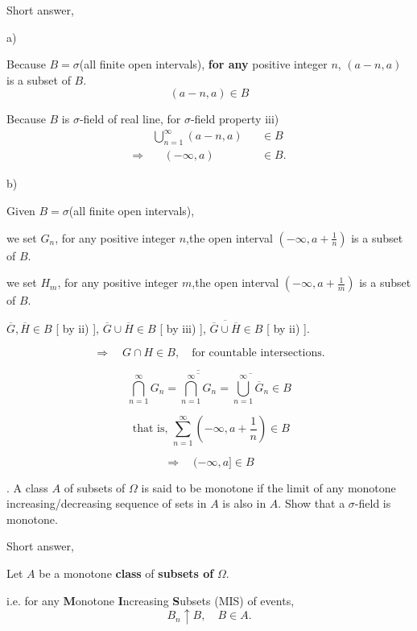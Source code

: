 \documentclass[12pt,thmsa]{article}
\begin{document}
\noindent
Short answer,

a)

Because \(B=\sigma\)(all finite open intervals), \textbf{for any} positive integer \(n\), \((a-n, a)\) is a subset of \(B\).
\[
(a-n, a) \in B
\]

Because \(B\) is \(\sigma\)-field of real line, for \(\sigma\)-field property iii)
\[
\begin{aligned}
	& \bigcup_{n=1}^{\infty}(a-n, a)& &\in B \\
	\Rightarrow &\quad (-\infty, a)& &\in B .
\end{aligned}
\]

b)

Given \(B=\sigma\)(all finite open intervals),

we set \(G_{n}\), for any positive integer \(n\),the open interval \(\left(-\infty, a+\frac{1}{n}\right)\) is a subset of \(B\).

we set \(H_{m}\), for any positive integer \(m\),the open interval \(\left(-\infty, a+\frac{1}{m}\right)\) is a subset of \(B\).

\(\overline{G}, \overline{H} \in B\) [ by ii) ], \(\overline{G} \cup \overline{H} \in B\) [ by iii) ], \( \overline{\overline{G} \cup \overline{H}} \in B\) [ by ii) ].

\[\Rightarrow \quad G \cap H \in B, \quad \text{for countable intersections.} \]

\[
\bigcap_{n=1}^{\infty} G_{n}
=\overline{\overline{\bigcap_{n=1}^{\infty} G_{n}}}
=\overline{\bigcup_{n=1}^{\infty} \overline{{G}}_{n}} \in B
\]

\[
\text { that is, } \sum_{n=1}^{\infty} \left(-\infty, a+\frac{1}{n}\right) \in B
\]

\[
\Rightarrow \quad(-\infty, a] \in B
\]

\medskip



. A class \(A\) of subsets of \(\Omega\) is said to be monotone if the limit of any monotone increasing/decreasing sequence of sets in \(A\) is also in \(A\). Show that a \(\sigma\)-field is monotone.

\noindent
Short answer,

Let \(A\) be a monotone \textbf{class} of \textbf{subsets of} \(\Omega\). 

i.e. for any \textbf{M}onotone \textbf{I}ncreasing \textbf{S}ubsets (MIS) of events,
\[
B_{n} \uparrow B, \quad B \in A.
\]
\end{document}
